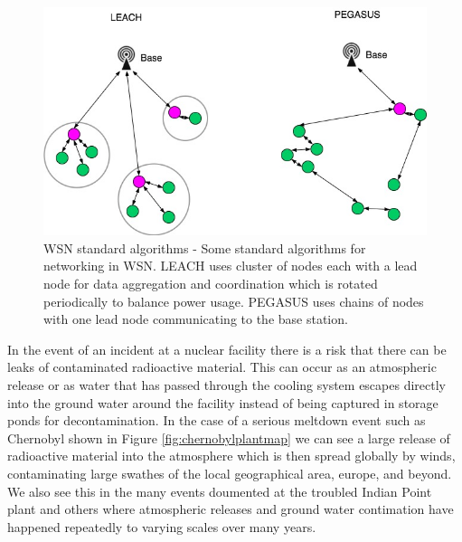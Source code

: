 \begin{figure}
	\centering
	\includegraphics[width=0.7\linewidth]{WSN_simulation_standard_algorithms}
	\caption{WSN standard algorithms - Some standard algorithms for networking in WSN. LEACH uses cluster of nodes each with a lead node for data aggregation and coordination which is rotated periodically to balance power usage. PEGASUS uses chains of nodes with one lead node communicating to the base station.}
	\label{fig:wsnsimulationstandardalgorithms}
\end{figure}

In the event of an incident at a nuclear facility there is a risk that there can be leaks of contaminated radioactive material. This can occur as an atmospheric release or as water that has passed through the cooling system escapes directly into the ground water around the facility instead of being captured in storage ponds for decontamination. In the case of a serious meltdown event such as Chernobyl \cite{Steinhauser2014, Evangeliou2016, Konoplev1992, Fesenko2007, Kortov2013} shown in Figure \ref{fig:chernobylplantmap} we can see a large release of radioactive material into the atmosphere which is then spread globally by winds, contaminating large swathes of the local geographical area, europe, and beyond. We also see this in the many events doumented at the troubled Indian Point plant\cite{TheGuardian} and others where atmospheric releases and ground water contimation have happened repeatedly to varying scales over many years.                                                                                                                                                                                                                                                                                                                                                                                                                                                                                
\newline
\newline


